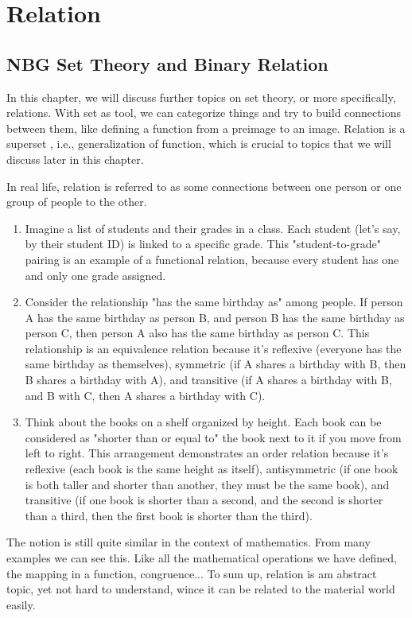 \chapterspaceabove{4.75cm} 
\chapterspacebelow{7.25cm} 
\chapter{Relation}

\section{NBG Set Theory and Binary Relation}
In this chapter, we will discuss further topics on set theory, or more specifically, 
relations. With set as tool, we can categorize things and try to build connections 
between them, like defining a function from a preimage to an image. Relation is a superset
, i.e., generalization of function, which is crucial to topics that we will discuss
later in this chapter.

In real life, relation is referred to as some connections between one person or 
one group of people to the other. 
\begin{enumerate}
    \item Imagine a list of students and their grades in a class. Each student 
    (let's say, by their student ID) is linked to a specific grade. 
    This "student-to-grade" pairing is an example of a functional relation, 
    because every student has one and only one grade assigned.
    \item Consider the relationship "has the same birthday as" among people. If person A has the same birthday as person B, and person B has the same birthday as person C, then person A also has the same birthday as person C. This relationship is an equivalence relation because it's reflexive (everyone has the same birthday as themselves), symmetric (if A shares a birthday with B, then B shares a birthday with A), and transitive (if A shares a birthday with B, and B with C, then A shares a birthday with C).
    \item Think about the books on a shelf organized by height. Each book can be considered as "shorter than or equal to" the book next to it if you move from left to right. This arrangement demonstrates an order relation because it's reflexive (each book is the same height as itself), antisymmetric (if one book is both taller and shorter than another, they must be the same book), and transitive (if one book is shorter than a second, and the second is shorter than a third, then the first book is shorter than the third).
\end{enumerate} 
The notion is still quite similar in the context of
mathematics. From many examples we can see this. Like all the mathematical operations
we have defined, the mapping in a function, congruence...
To sum up, relation is am abstract topic, yet not hard to understand, wince it can be
related to the material world easily. 
